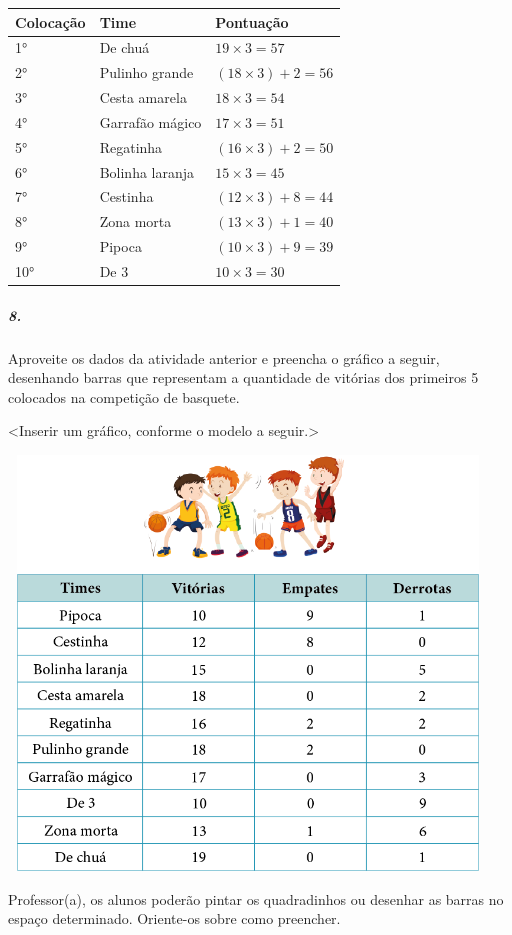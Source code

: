 \begin{longtable}[]{@{}lll@{}}
\toprule
Colocação & Time & Pontuação\tabularnewline
\midrule
\endhead
1° & De chuá & \(19 \times 3 = 57\ \)\tabularnewline
2° & Pulinho grande &
\(\left( 18 \times 3 \right) + 2 = 56\)\tabularnewline
3° & Cesta amarela & \(18 \times 3 = 54\ \)\tabularnewline
4° & Garrafão mágico & \(17 \times 3 = 51\ \)\tabularnewline
5° & Regatinha & \(\left( 16 \times 3 \right) + 2 = 50\)\tabularnewline
6° & Bolinha laranja & \(15 \times 3 = 45\ \)\tabularnewline
7° & Cestinha & \(\left( 12 \times 3 \right) + 8 = 44\)\tabularnewline
8° & Zona morta & \(\left( 13 \times 3 \right) + 1 = 40\)\tabularnewline
9° & Pipoca & \(\left( 10 \times 3 \right) + 9 = 39\)\tabularnewline
10° & De 3 & \(10 \times 3 = 30\ \)\tabularnewline
\bottomrule
\end{longtable}

\subparagraph{8.}\label{section-83}

Aproveite os dados da atividade anterior e preencha o gráfico a seguir,
desenhando barras que representam a quantidade de vitórias dos primeiros
5 colocados na competição de basquete.

\textless{}Inserir um gráfico, conforme o modelo a seguir.\textgreater{}

\includegraphics[width=5.00000in,height=4.33333in]{media/image94.png}

Professor(a), os alunos poderão pintar os quadradinhos ou desenhar as barras no espaço determinado. Oriente-os sobre como preencher.

